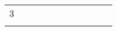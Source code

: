 \begin{table}[]
\begin{tabular}{lllllllllll}
\cellcolor[HTML]{FC8D59}3 &                           &                   &                                                               &                                                                                                                 &                           &                                                             &                                                                            &                                                                                          &                                        &                                                                                                                 \\
                          &                           &                   & \cellcolor[HTML]{FC8D59}{}    &                                                                                                                 &                           &                                                             &                                                                            &                                                                                          &                                        &                                                                                                                
\end{tabular}
\end{table}
